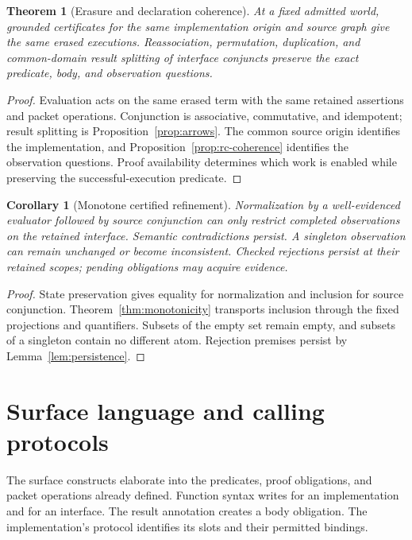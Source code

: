 \documentclass[10pt,a4paper]{article}
\newcommand{\code}[1]{\texttt{\detokenize{#1}}}
\newtheorem{theorem}[definition]{Theorem}
\newtheorem{corollary}[definition]{Corollary}
\theoremstyle{remark}
\begin{document}
\begin{theorem}[Erasure and declaration coherence]\label{thm:erasure}
At a fixed admitted world, grounded certificates for the same implementation
origin and source graph give the same erased executions. Reassociation,
permutation, duplication, and common-domain result splitting of interface
conjuncts preserve the exact predicate, body, and observation questions.
\end{theorem}
\begin{proof}
Evaluation acts on the same erased term with the same retained assertions and
packet operations. Conjunction is associative, commutative, and idempotent;
result splitting is Proposition~\ref{prop:arrows}. The common source origin
identifies the implementation, and Proposition~\ref{prop:rc-coherence}
identifies the observation questions. Proof availability determines which work
is enabled while preserving the successful-execution predicate.
\end{proof}

\begin{corollary}[Monotone certified refinement]\label{cor:refinement}
Normalization by a well-evidenced evaluator followed by source conjunction can
only restrict completed observations on the retained interface. Semantic
contradictions persist. A singleton observation can remain unchanged or become
inconsistent. Checked rejections persist at their retained scopes; pending
obligations may acquire evidence.
\end{corollary}
\begin{proof}
State preservation gives equality for normalization and inclusion for source
conjunction. Theorem~\ref{thm:monotonicity} transports inclusion through the
fixed projections and quantifiers. Subsets of the empty set remain empty, and
subsets of a singleton contain no different atom. Rejection premises persist
by Lemma~\ref{lem:persistence}.
\end{proof}

\section{Surface language and calling protocols}
\label{sec:surface}
The surface constructs elaborate into the predicates, proof obligations, and
packet operations already defined. Function syntax writes
\code{func(parameters) -> T: e} for an implementation and
\code{func(parameters) -> T} for an interface. The result annotation creates a
body obligation. The implementation's protocol identifies its slots and their
permitted bindings.
\end{document}
